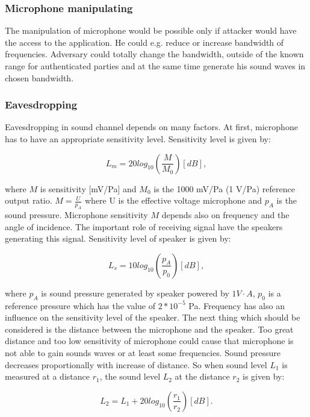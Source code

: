 \documentclass[11pt,titlepage]{article}
\theoremstyle{plain}
\begin{document}
\subsubsection{Microphone manipulating}
The manipulation of microphone would be possible only if attacker would have the access to the application. He could e.g. reduce or increase bandwidth of frequencies. Adversary could totally change the bandwidth, outside of the known range for authenticated parties and at the same time generate his sound waves in chosen bandwidth.

\subsubsection{Eavesdropping}
Eavesdropping in sound channel depends on many factors.
 At first, microphone has to have an appropriate sensitivity level. Sensitivity level is given by:
 
 \begin{equation}
 L_m = 20 log_{10}\left(\frac{M}{M_0}\right)[dB],
 \end{equation}
 
 where $M$ is sensitivity [mV/Pa] and $M_0$ is the 1000 mV/Pa (1 V/Pa) reference output ratio. $M = \frac{U}{p_A}$ where U is the effective voltage microphone and $p_A$ is the sound pressure. Microphone sensitivity $M$ depends also on frequency and the angle of incidence. The important role of receiving signal have the speakers generating this signal. Sensitivity level of speaker is given by: 
 
 \begin{equation}
 L_s = 10 log_{10}\left(\frac{p_A}{p_0}\right)[dB],
 \end{equation}
 
 where $p_A$ is sound pressure generated by speaker powered by $1V \cdot A$, $p_0$ is a reference pressure which has the value of $2*10^{-5}$ Pa. Frequency has also an influence on the sensitivity level of the speaker. The next thing which should be considered is the distance between the microphone and the speaker. Too great distance and too low sensitivity of microphone could cause that microphone is not able to gain sounds waves or at least some frequencies. Sound pressure decreases proportionally with increase of distance. So when sound level $L_{1}$ is measured at a distance $r_1$, the sound level $L_2$ at the distance $r_2$ is given by:
 
 \begin{equation}
 L_2 = L_1 + 20 log_{10} \left(\frac{r_1}{r_2}\right)[dB].
 \end{equation}
\end{document}
